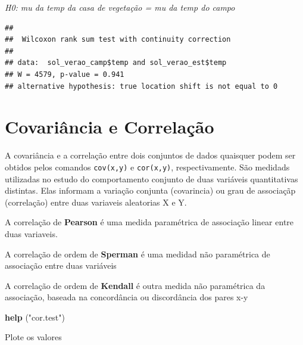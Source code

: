 \documentclass[
]{book}
\newenvironment{Shaded}{\begin{snugshade}}{\end{snugshade}}
\newcommand{\DataTypeTok}[1]{\textcolor[rgb]{0.13,0.29,0.53}{#1}}
\newcommand{\DecValTok}[1]{\textcolor[rgb]{0.00,0.00,0.81}{#1}}
\newcommand{\KeywordTok}[1]{\textcolor[rgb]{0.13,0.29,0.53}{\textbf{#1}}}
\newcommand{\NormalTok}[1]{#1}
\newcommand{\OperatorTok}[1]{\textcolor[rgb]{0.81,0.36,0.00}{\textbf{#1}}}
\newcommand{\StringTok}[1]{\textcolor[rgb]{0.31,0.60,0.02}{#1}}
\begin{document}
\emph{H0: mu da temp da casa de vegetação = mu da temp do campo}

\begin{Shaded}
\end{Shaded}

\begin{verbatim}
## 
##  Wilcoxon rank sum test with continuity correction
## 
## data:  sol_verao_camp$temp and sol_verao_est$temp
## W = 4579, p-value = 0.941
## alternative hypothesis: true location shift is not equal to 0
\end{verbatim}

\hypertarget{covariuxe2ncia-e-correlauxe7uxe3o}{%
\section{Covariância e Correlação}\label{covariuxe2ncia-e-correlauxe7uxe3o}}

A covariância e a correlação entre dois conjuntos de dados quaisquer podem ser obtidos pelos comandos \texttt{cov(x,y)} e \texttt{cor(x,y)}, respectivamente.
São medidads utilizadas no estudo do comportamento conjunto de duas variáveis quantitativas distintas. Elas informam a variação conjunta (covarincia) ou grau de associaçãp (correlação) entre duas variaveis aleatorias X e Y.

A correlação de \textbf{Pearson} é uma medida paramétrica de associação linear entre duas variaveis.

A correlação de ordem de \textbf{Sperman} é uma medidad não paramétrica de associação entre duas variáveis

A correlação de ordem de \textbf{Kendall} é outra medida não paramétrica da associação, baseada na concordância ou discordância dos pares x-y

\begin{Shaded}
\begin{Highlighting}[]
\KeywordTok{help}\NormalTok{ (}\StringTok{"cor.test"}\NormalTok{)}
\end{Highlighting}
\end{Shaded}

Plote os valores

\begin{Shaded}
\end{Shaded}
\end{document}
